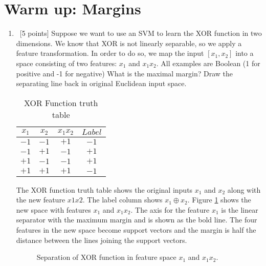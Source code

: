 \section{Warm up: Margins}
\label{sec:q1}

\begin{enumerate}

\item ~[5 points] Suppose we want to use an SVM to learn the XOR
  function in two dimensions. We know that XOR is not linearly
  separable, so we apply a feature transformation. In order to do so,
  we map the input $[x_1, x_2] $ into a space consisting of two
  features: $x_1$ and $x_1 x_2$. All examples are Boolean (1 for
  positive and -1 for negative) What is the maximal margin? Draw the
  separating line back in original Euclidean input space.

  \begin{table}[H]
    \centering
    \begin{tabular}{| c | c | c  |  c | }
      \hline
      $x_1$ & $x_2$  & $x_1x_2$ & $Label$ \\
      \hline
      $-1$ & $-1$ & $+1$ & $-1$\\
      $-1$ & $+1$ & $-1$ & $+1$\\
      $+1$ & $-1$ & $-1$ & $+1$\\
      $+1$ & $+1$ & $+1$ & $-1$\\
      \hline
    \end{tabular}
    \caption*{XOR Function truth table}
  \end{table}

The XOR function truth table shows the original inputs $x_1$ and $x_2$ along with the new feature $x1x2$. The label column shows $x_1 \oplus x_2$. Figure \ref{XorSvm} shows the new space with features $x_1$ and $x_1x_2$. The axis for the feature $x_1$ is the linear separator with the maximum margin and is shown as the bold line. The four features in the new space become support vectors and the margin is half the distance between the lines joining the support vectors.
  \begin{figure}[H]
    \centering
    \caption{Separation of XOR function in feature space $x_1$ and $x_1x_2$.} \label{XorSvm}
  \end{figure}


\end{enumerate}
